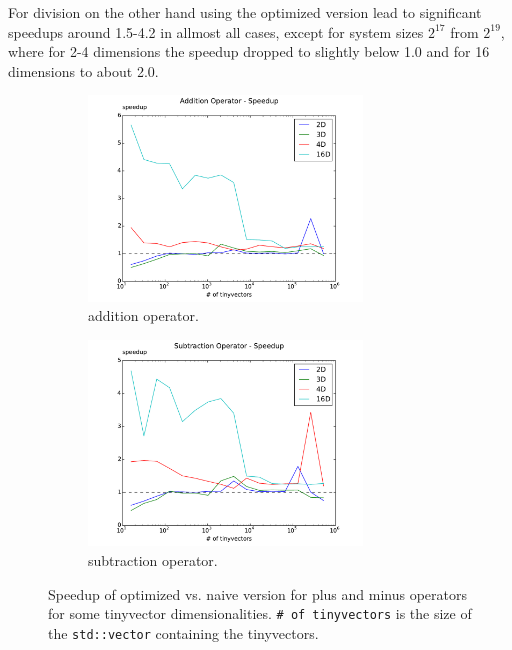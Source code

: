 \documentclass[a4paper]{scrartcl}
\begin{document}
For division on the other hand using the optimized version lead to significant speedups around 1.5-4.2 in allmost all cases, except for system sizes $2^17$ from $2^19$, where for 2-4 dimensions the speedup dropped to slightly below 1.0 and for 16 dimensions to about 2.0.

\begin{figure}
    \begin{subfigure}{\textwidth}
        \includegraphics[width=0.8\textwidth]{results/su_plus.pdf}
        \caption{addition operator.}
        \label{fig:su-pl} 
    \end{subfigure}

    \begin{subfigure}{\textwidth}
        \includegraphics[width=0.8\textwidth]{results/su_minus.pdf}
        \caption{subtraction operator.}
        \label{fig:su-mi}
    \end{subfigure}
    \caption{Speedup of optimized vs. naive version for plus and minus operators for some tinyvector dimensionalities. \texttt{\# of tinyvectors} is the size of the \texttt{std::vector} containing the tinyvectors.}
\end{figure}
\end{document}
